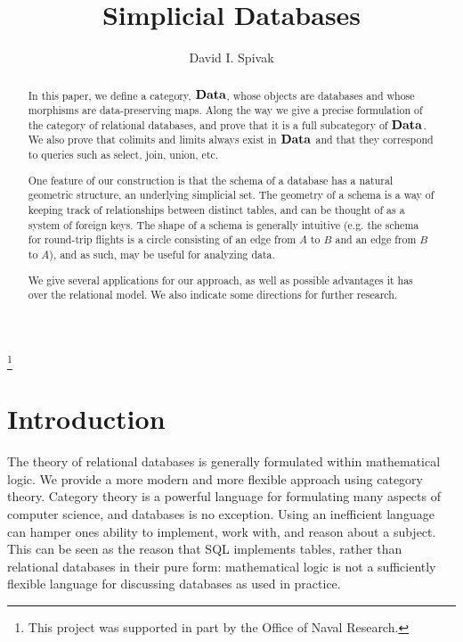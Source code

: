 \documentclass{amsart}
\def\Data{{\bf Data}}
\begin{document}
\author{David I. Spivak}

\thanks{This project was supported in part by the Office of Naval Research.}

\title{Simplicial Databases}

\maketitle

\begin{abstract}

In this paper, we define a category, $\Data$, whose objects are databases and whose morphisms are data-preserving maps.  Along the way we give a precise formulation of the category of relational databases, and prove that it is a full subcategory of $\Data$.  We also prove that colimits and limits always exist in $\Data$ and that they correspond to queries such as select, join, union, etc.

One feature of our construction is that the schema of a database has a natural geometric structure, an underlying simplicial set.  The geometry of a schema is a way of keeping track of relationships between distinct tables, and can be thought of as a system of foreign keys.  The shape of a schema is generally intuitive (e.g. the schema for round-trip flights is a circle consisting of an edge from $A$ to $B$ and an edge from $B$ to $A$), and as such, may be useful for analyzing data.

We give several applications for our approach, as well as possible advantages it has over the relational model.  We also indicate some directions for further research.

\end{abstract}

\setcounter{tocdepth}{1}

\tableofcontents


\section{Introduction}\label{sec:intro}


The theory of relational databases is generally formulated within mathematical logic.  We provide a more modern and more flexible approach using category theory.  Category theory is a powerful language for formulating many aspects of computer science, and databases is no exception.  Using an inefficient language can hamper ones ability to implement, work with, and reason about a subject.  This can be seen as the reason that SQL implements tables, rather than relational databases in their pure form: mathematical logic is not a sufficiently flexible language for discussing databases as used in practice.
\end{document}
